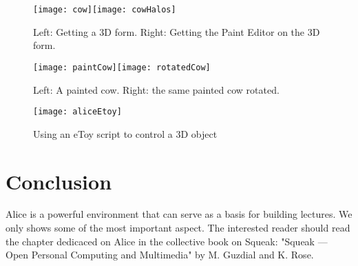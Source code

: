 \begin{figure}[h]
\begin{center}\texttt{[image: cow]}\texttt{[image: cowHalos]}\end{center}\caption{Left: Getting a 3D form. Right: Getting the Paint Editor on the 3D form.\label{fig:poohPaint}}
\end{figure}

\begin{figure}[h]
\begin{center}\texttt{[image: paintCow]}\texttt{[image: rotatedCow]} \end{center}\caption{Left: A painted cow. Right: the same painted cow rotated.\label{fig:paintCow}}\end{figure}

\begin{figure}[h]\begin{center}\texttt{[image: aliceEtoy]} \end{center}\caption{Using an eToy script to control a 3D object\label{fig:aliceEtoy}}\end{figure}


\section{Conclusion}
Alice is a powerful environment that can serve as a basis for building lectures. We only shows some of the most important aspect. The interested reader should read 
the chapter dedicaced on Alice in the collective book on Squeak: "Squeak --- Open Personal Computing and Multimedia" by M. Guzdial and K. Rose.


\ifx\wholebook\relax\else\fi


